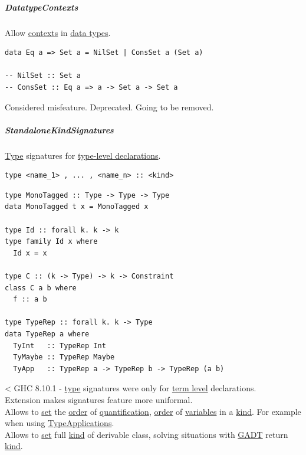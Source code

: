 \documentclass[11pt]{article}
\begin{document}
\subparagraph{\label{org805bbd3}DatatypeContexts}
\label{sec:orga14d102}
Allow \hyperref[orge18c92a]{contexts} in \hyperref[org5c444ae]{data types}.\\
\begin{verbatim}
data Eq a => Set a = NilSet | ConsSet a (Set a)

-- NilSet :: Set a
-- ConsSet :: Eq a => a -> Set a -> Set a
\end{verbatim}
Considered misfeature. Deprecated. Going to be removed.\\

\subparagraph{\label{org4336969}StandaloneKindSignatures}
\label{sec:orgd049580}
\hyperref[orgc4aea2f]{Type} signatures for \hyperref[orgcbf8a85]{type-level declarations}.\\

\begin{verbatim}
type <name_1> , ... , <name_n> :: <kind>
\end{verbatim}

\begin{verbatim}
type MonoTagged :: Type -> Type -> Type
data MonoTagged t x = MonoTagged x

type Id :: forall k. k -> k
type family Id x where
  Id x = x

type C :: (k -> Type) -> k -> Constraint
class C a b where
  f :: a b

type TypeRep :: forall k. k -> Type
data TypeRep a where
  TyInt   :: TypeRep Int
  TyMaybe :: TypeRep Maybe
  TyApp   :: TypeRep a -> TypeRep b -> TypeRep (a b)
\end{verbatim}

< GHC 8.10.1 - \hyperref[orgc4aea2f]{type} signatures were only for \hyperref[org4d02774]{term level} declarations.\\

Extension makes signatures feature more uniformal.\\

Allows to \hyperref[org1faf06d]{set} the \hyperref[orgc0a359b]{order} of \hyperref[orgfcc3eee]{quantification}, \hyperref[orgc0a359b]{order} of \hyperref[orge17f54f]{variables} in a \hyperref[orgd0eb143]{kind}. For example when using \hyperref[orge6ba2f2]{TypeApplications}.\\

Allows to \hyperref[org1faf06d]{set} full \hyperref[orgd0eb143]{kind} of derivable class, solving situations with \hyperref[org74d64c6]{GADT} return \hyperref[orgd0eb143]{kind}.\\
\end{document}
